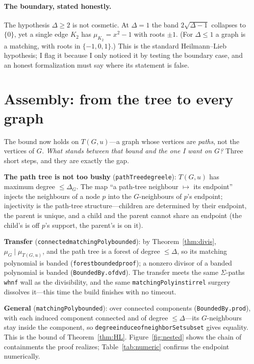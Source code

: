 \documentclass[11pt]{article}
\newcommand{\lean}[1]{{\def\_{\textunderscore\allowbreak}\texttt{#1}}}
\begin{document}
\paragraph{The boundary, stated honestly.} The hypothesis $\Delta\ge2$ is not
cosmetic. At $\Delta=1$ the band $2\sqrt{\Delta-1}$ collapses to $\{0\}$, yet a
single edge $K_2$ has $\mu_{K_2}=x^2-1$ with roots $\pm1$. (For $\Delta\le1$ a
graph is a matching, with roots in $\{-1,0,1\}$.) This is the standard
Heilmann--Lieb hypothesis; I flag it because I only noticed it by testing the
boundary case, and an honest formalization must say where its statement is false.

\section{Assembly: from the tree to every graph}
\label{sec:assembly}

The bound now holds on $T(G,u)$---a graph whose vertices are \emph{paths}, not the
vertices of $G$. \emph{What stands between that bound and the one I want on $G$?}
Three short steps, and they are exactly the gap.

\textbf{The path tree is not too bushy} (\lean{pathTree\_degree\_le}): $T(G,u)$ has
maximum degree $\le\Delta_G$. The map ``a path-tree neighbour $\mapsto$ its
endpoint'' injects the neighbours of a node $p$ into the $G$-neighbours of $p$'s
endpoint; injectivity is the path-tree structure---children are determined by their
endpoint, the parent is unique, and a child and the parent cannot share an
endpoint (the child's is off $p$'s support, the parent's is on it).

\textbf{Transfer} (\lean{connected\_matchingPoly\_bounded}): by
Theorem~\ref{thm:divis}, $\mu_G\mid\mu_{T(G,u)}$, and the path tree is a forest of
degree $\le\Delta$, so its matching polynomial is banded
(\lean{forest\_bounded\_proof}); a nonzero divisor of a banded polynomial is banded
(\lean{BoundedBy.of\_dvd}). The transfer meets the same $\Sigma$-paths
\lean{whnf} wall as the divisibility, and the same \lean{matchingPoly\_inst\_irrel}
surgery dissolves it---this time the build finishes with no timeout.

\textbf{General} (\lean{matchingPoly\_bounded}): over connected components
(\lean{BoundedBy.prod}), with each induced component connected and of degree
$\le\Delta$---its $G$-neighbours stay inside the component, so
\lean{degree\_induce\_of\_neighborSet\_subset} gives equality. This is the bound
of Theorem~\ref{thm:HL}. Figure~\ref{fig:nested} shows the chain of containments
the proof realizes; Table~\ref{tab:numeric} confirms the endpoint numerically.
\end{document}
